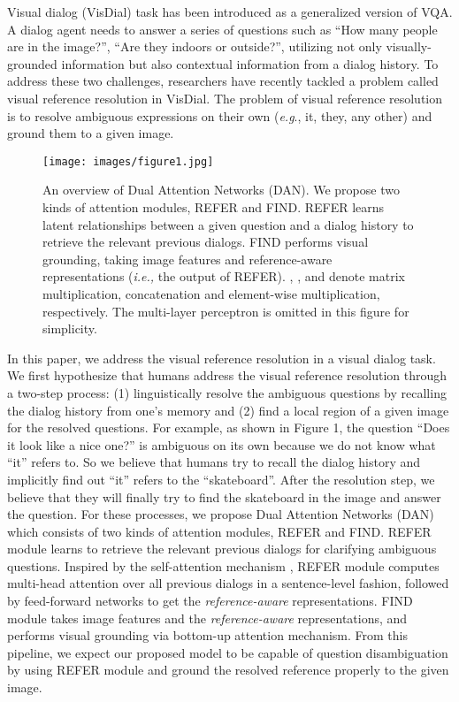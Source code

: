 \documentclass[11pt,a4paper]{article}
\begin{document}
Visual dialog (VisDial) \cite{das2017visual} task has been introduced as a generalized version of VQA. A dialog agent needs to answer a series of questions such as ``How many people are in the image?'', ``Are they indoors or outside?'', utilizing not only visually-grounded information but also contextual information from a dialog history. To address these two challenges, researchers have recently tackled a problem called visual reference resolution in VisDial. The problem of visual reference resolution is to resolve ambiguous expressions on their own ({\it e.g}., it, they, any other) and ground them to a given image. 

\begin{figure*}[ht!]
\label{figure:architecture1}
\centering
\texttt{[image: images/figure1.jpg]}
\caption{An overview of Dual Attention Networks (DAN). We propose two kinds of attention modules, REFER and FIND. REFER learns latent relationships between a given question and a dialog history to retrieve the relevant previous dialogs. FIND performs visual grounding, taking image features and reference-aware representations ({\it i.e.,} the output of REFER). , , and  denote matrix multiplication, concatenation and element-wise multiplication, respectively. The multi-layer perceptron is omitted in this figure for simplicity.}
\end{figure*}

In this paper, we address the visual reference resolution in a visual dialog task. We first hypothesize that humans address the visual reference resolution through a two-step process: (1) linguistically resolve the ambiguous questions by recalling the dialog history from one's memory and (2) find a local region of a given image for the resolved questions.  For example, as shown in Figure 1, the question ``Does it look like a nice one?'' is ambiguous on its own because we do not know what ``it'' refers to. So we believe that humans try to recall the dialog history and implicitly find out ``it'' refers to the ``skateboard''. After the resolution step, we believe that they will finally try to find the skateboard in the image and answer the question. For these processes, we propose Dual Attention Networks (DAN) which consists of two kinds of attention modules, REFER and FIND. REFER module learns to retrieve the relevant previous dialogs for clarifying ambiguous questions. Inspired by the self-attention mechanism \cite{vaswani2017attention}, REFER module computes multi-head attention over all previous dialogs in a sentence-level fashion, followed by feed-forward networks to get the {\it reference-aware} representations. FIND module takes image features and the {\it reference-aware} representations, and performs visual grounding via bottom-up attention mechanism. From this pipeline, we expect our proposed model to be capable of question disambiguation by using REFER module and ground the resolved reference properly to the given image. 
\end{document}

